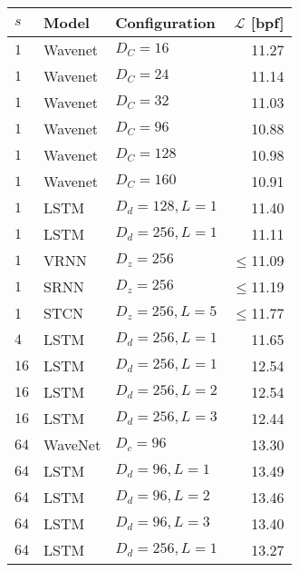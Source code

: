 {\begin{table}[p]
    \centering
    \begin{tabular}{ll|lr}
        \toprule
        $s$    & \bfseries Model           & \bfseries Configuration           & \bfseries $\mathcal{L}$ [bpf] \\
        \midrule
        $1$       & Wavenet             & $D_C=16$              & 11.27 \\
        $1$       & Wavenet             & $D_C=24$              & 11.14 \\
        $1$       & Wavenet             & $D_C=32$              & 11.03 \\
        $1$       & Wavenet             & $D_C=96$              & 10.88 \\
        $1$       & Wavenet             & $D_C=128$             & 10.98 \\
        $1$       & Wavenet             & $D_C=160$             & 10.91 \\
        $1$       & LSTM                & $D_d=128, L=1$        & 11.40 \\
        $1$       & LSTM                & $D_d=256, L=1$        & 11.11 \\
        $1$       & VRNN                & $D_z=256$             & $\leq$11.09 \\
        $1$       & SRNN                & $D_z=256$             & $\leq$11.19 \\
        1 & STCN                & $D_z=256,L=5$               & $\leq$11.77 \\  %
        \midrule
        $4$       & LSTM                & $D_d=256, L=1$        & 11.65 \\
        \midrule
        $16$      & LSTM                & $D_d=256, L=1$        & 12.54 \\
        $16$      & LSTM                & $D_d=256, L=2$        & 12.54 \\
        $16$      & LSTM                & $D_d=256, L=3$        & 12.44 \\
        \midrule
        $64$      & WaveNet             & $D_c=96$              & 13.30 \\
        $64$      & LSTM                & $D_d=96, L=1$         & 13.49 \\
        $64$      & LSTM                & $D_d=96, L=2$         & 13.46 \\
        $64$      & LSTM                & $D_d=96, L=3$         & 13.40 \\
        $64$      & LSTM                & $D_d=256, L=1$        & 13.27 \\

\end{tabular}
\end{table}}
